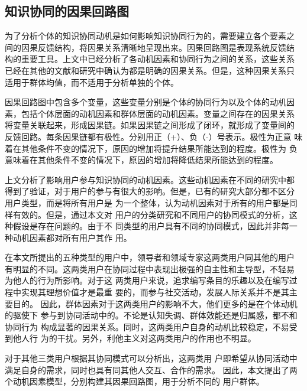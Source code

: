 \subsection{知识协同的因果回路图}
\label{sec:causality}

为了分析个体的知识协同动机是如何影响知识协同行为的，需要建立各个要素之
间的因果反馈结构，将因果关系清晰地呈现出来。因果回路图是表现系统反馈结
构的重要工具。上文中已经分析了各动机因素和协同行为之间的关系，这些关系
已经在其他的文献和研究中确认为都是明确的因果关系。但是，这种因果关系只
适用于群体均值，而不适用于分析单独的个体。

因果回路图中包含多个变量，这些变量分别是个体的协同行为以及个体的动机因
素，包括个体层面的动机因素和群体层面的动机因素。变量之间存在的因果关系
将变量关联起来，形成因果链。如果因果链之间形成了闭环，就形成了变量间的
反馈回路。每条因果链都有极性。分别用正（+）、负（-）号表示。极性为正意
味着在其他条件不变的情况下，原因的增加将提升结果所能达到的程度。极性为
负意味着在其他条件不变的情况下，原因的增加将降低结果所能达到的程度。

上文分析了影响用户参与知识协同的动机因素。这些动机因素在不同的研究中都
得到了验证，对于用户的参与有很大的影响。但是，已有的研究大部分都不区分
用户类型，而是将所有用户是
为一个整体，认为动机因素对于所有的用户都是同样有效的。但是，通过本文对
用户的分类研究和不同用户的协同模式的分析，这种假设是存在问题的。由于不
同类型的用户具有不同的协同模式，因此并非每一种动机因素都对所有用户其作
用。

在本文所提出的五种类型的用户中，领导者和领域专家这两类用户同其他的用户
有明显的不同。这两类用户在协同过程中表现出极强的自主性和主导型，不轻易
为他人的行为所影响。对于这
两类用户来说，追求编写条目的乐趣以及在编写过程中实现其理想价值才是最重
要的，而参与社交活动，发展人际关系并不是其主要目的\cite{Rafaeli2008}。
因此，群体因素对于这两类用户的影响不大，他们更多的是在个体动机的驱使下
参与到协同活动中的。不论是认知失调、群体效能还是归属感，都不和协同行为
构成显著的因果关系。同时，这两类用户自身的动机比较稳定，不易受到他人行
为的干扰。另外，利他主义对这两类用户的作用也不明显。

对于其他三类用户根据其协同模式可以分析出，这两类用
户即希望从协同活动中满足自身的需求，同时也具有同其他人交互、合作的需求。
因此，本文提出了两个动机因素模型，分别构建其因果回路图，用于分析不同的
用户群体。

